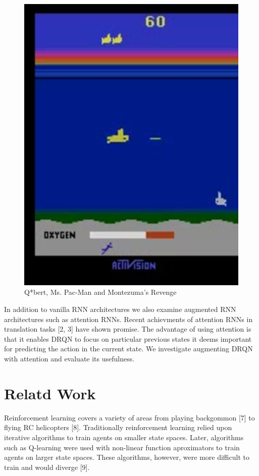 \documentclass{article}
\begin{document}
\begin{figure}[h]
\begin{minipage}{0.8\textwidth}
            \centering
            \includegraphics[scale=0.15]{Seaquest}
        \end{minipage}
        \caption{Q*bert, Ms. Pac-Man and Montezuma's Revenge}
    \end{figure}


    In addition to vanilla RNN architectures we also examine augmented RNN
    architectures such as attention RNNs. Recent achievments of attention RNNs in
    translation tasks [2, 3] have shown promise. The advantage of using attention
    is that it enables DRQN to focus on particular previous states it deems
    important for predicting the action in the current state. We investigate
    augmenting DRQN with attention and evaluate its usefulness.

\section{Relatd Work}

Reinforcement learning covers a variety of areas from playing backgommon [7] to
flying RC helicopters [8]. Traditionally reinforcement learning relied upon
iterative algorithms to train agents on smaller state spaces. Later, algorithms
such as Q-learning were used with non-linear function aproximators to train agents
on larger state spaces. These algorithms, however, were more difficult to train
and would diverge [9].
\end{document}
